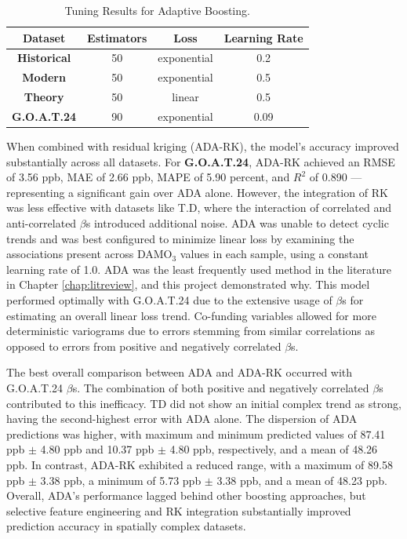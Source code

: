 \begin{table}[h!]
    \centering
        \begin{tabular}{||c|ccc||}
            \hline 
            \textbf{Dataset} & \textbf{Estimators} & \textbf{Loss} & \textbf{Learning Rate} \\
            \hline \hline 
            \textbf{Historical} & 50 & exponential & 0.2 \\[3pt]
            \textbf{Modern} & 50 & exponential & 0.5 \\[3pt]
            \textbf{Theory} & 50 & linear & 0.5 \\[3pt]
            \textbf{G.O.A.T.24} & 90 & exponential & 0.09 \\[3pt]
            \hline
        \end{tabular}
    \caption{Tuning Results for Adaptive Boosting.} 
    \label{tab:ada_model_tuning}
\end{table} When combined with residual kriging (ADA-RK), the model’s accuracy improved substantially across all datasets. For \textbf{G.O.A.T.24}, ADA-RK achieved an RMSE of 3.56 ppb, MAE of 2.66 ppb, MAPE of 5.90 percent, and $R^{2}$ of 0.890 — representing a significant gain over ADA alone. However, the integration of RK was less effective with datasets like T.D, where the interaction of correlated and anti-correlated $\beta$s introduced additional noise. ADA was unable to detect cyclic trends and was best configured to minimize linear loss by examining the associations present across DAMO$_3$ values in each sample, using a constant learning rate of 1.0. ADA was the least frequently used method in the literature in Chapter \ref{chap:litreview}, and this project demonstrated why. This model performed optimally with G.O.A.T.24 due to the extensive usage of $\beta$s for estimating an overall linear loss trend. Co-funding variables allowed for more deterministic variograms due to errors stemming from similar correlations as opposed to errors from positive and negatively correlated $\beta$s. 

The best overall comparison between ADA and ADA-RK occurred with G.O.A.T.24 $\beta$s. The combination of both positive and negatively correlated $\beta$s contributed to this inefficacy. TD did not show an initial complex trend as strong, having the second-highest error with ADA alone. The dispersion of ADA predictions was higher, with maximum and minimum predicted values of 87.41 ppb $\pm$ 4.80 ppb and 10.37 ppb $\pm$ 4.80 ppb, respectively, and a mean of 48.26 ppb. In contrast, ADA-RK exhibited a reduced range, with a maximum of 89.58 ppb $\pm$ 3.38 ppb, a minimum of 5.73 ppb $\pm$ 3.38 ppb, and a mean of 48.23 ppb. Overall, ADA’s performance lagged behind other boosting approaches, but selective feature engineering and RK integration substantially improved prediction accuracy in spatially complex datasets.
